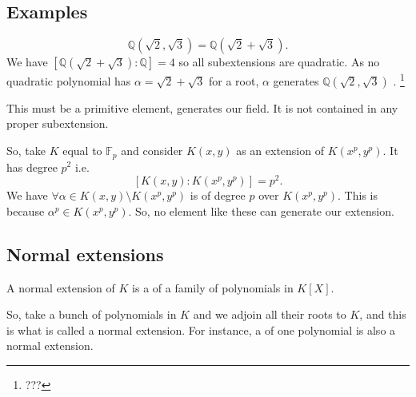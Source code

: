 \subsection{Examples}

\begin{example}
  \[
  \mathbb{Q}\left(\sqrt{2}, \sqrt{3}\right) =
  \mathbb{Q}\left(\sqrt{2} + \sqrt{3}\right).
  \]
  We have
  $\left[\mathbb{Q}\left(\sqrt{2} + \sqrt{3}\right) :
    \mathbb{Q}\right] = 4$ so all subextensions are quadratic. As no
  quadratic polynomial has $\alpha = \sqrt{2} + \sqrt{3}$ for a root,
  $\alpha$ generates $\mathbb{Q}\left(\sqrt{2}, \sqrt{3}\right)$
  .
  \footnote{
    ???
  }

  This must be a primitive element, generates our field. 
  It is not contained in any proper subextension. 
\end{example}

\begin{example}
  So, take $K$ equal to $\mathbb{F}_p$ and consider
  $K\left(x,y\right)$ as an
  extension of $K\left(x^p,y^p\right)$. It has degree $p^2$ i.e.
  \[
  \left[
    K\left(x,y\right) : K\left(x^p,y^p\right)
    \right] = p^2.
  \]
  We have $\forall \alpha \in K\left(x,y\right) \setminus
  K\left(x^p,y^p\right)$ is of degree $p$ over
  $K\left(x^p,y^p\right)$. This is because
  $\alpha^p \in K\left(x^p,y^p\right)$. So, no element like these can
  generate our extension.  
\end{example}

\subsection{Normal extensions}

\begin{definition}
  A normal extension of $K$ is a  of a
  family of polynomials in $K\left[X\right]$.
  \label{def:normalextension}
\end{definition}

\begin{remark}
  So, take a bunch of polynomials in $K$ and we adjoin all their roots
  to $K$, and this is what is called a normal extension.
  For instance, a  of one polynomial is
  also a normal extension. 
\end{remark}

